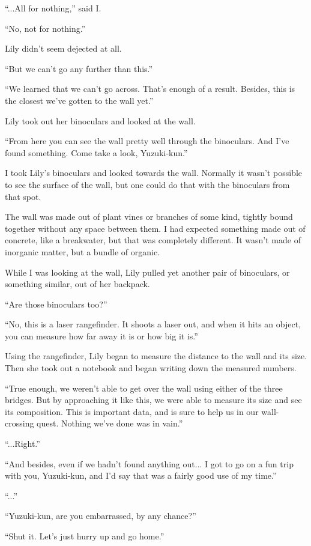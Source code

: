 ``...All for nothing,'' said I.

``No, not for nothing.''

Lily didn't seem dejected at all.

``But we can't go any further than this.''

``We learned that we can't go across. That's enough of a result. Besides, this is the closest we've gotten to the wall yet.''

Lily took out her binoculars and looked at the wall.

``From here you can see the wall pretty well through the binoculars. And I've found something. Come take a look, Yuzuki-kun.''

I took Lily's binoculars and looked towards the wall. Normally it wasn't possible to see the surface of the wall, but one could do that with the binoculars from that spot.

The wall was made out of plant vines or branches of some kind, tightly bound together without any space between them. I had expected something made out of concrete, like a breakwater, but that was completely different. It wasn't made of inorganic matter, but a bundle of organic.

While I was looking at the wall, Lily pulled yet another pair of binoculars, or something similar, out of her backpack.

``Are those binoculars too?''

``No, this is a laser rangefinder. It shoots a laser out, and when it hits an object, you can measure how far away it is or how big it is.''

Using the rangefinder, Lily began to measure the distance to the wall and its size. Then she took out a notebook and began writing down the measured numbers.

``True enough, we weren't able to get over the wall using either of the three bridges. But by approaching it like this, we were able to measure its size and see its composition. This is important data, and is sure to help us in our wall-crossing quest. Nothing we've done was in vain.''

``...Right.''

``And besides, even if we hadn't found anything out... I got to go on a fun trip with you, Yuzuki-kun, and I'd say that was a fairly good use of my time.''

``...''

``Yuzuki-kun, are you embarrassed, by any chance?''

``Shut it. Let's just hurry up and go home.''


